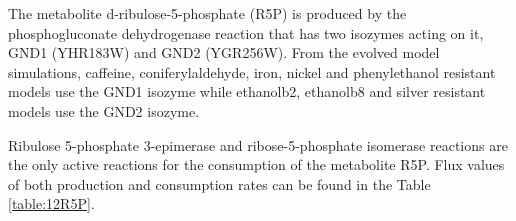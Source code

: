 The metabolite d-ribulose-5-phosphate (R5P) is produced by the phosphogluconate dehydrogenase reaction that has two isozymes acting on it, GND1 (YHR183W) and GND2 (YGR256W). From the evolved model simulations, caffeine, coniferylaldehyde, iron, nickel and phenylethanol resistant models use the GND1 isozyme while ethanolb2, ethanolb8 and silver resistant models use the GND2 isozyme.

Ribulose 5-phosphate 3-epimerase and ribose-5-phosphate isomerase reactions are the only active reactions for the consumption of the metabolite R5P. Flux values of both production and consumption rates can be found in the Table \ref{table:12R5P}.

\begin{table}[H]
\vspace{0.5cm}
\caption[Producing and consuming reaction fluxes for the metabolite d-ribulose-5-phosphate (R5P).]{Producing and consuming reaction fluxes for the metabolite d-ribulose-5-phosphate (R5P).}
\setlength{\tabcolsep}{4pt}
\end{table}
